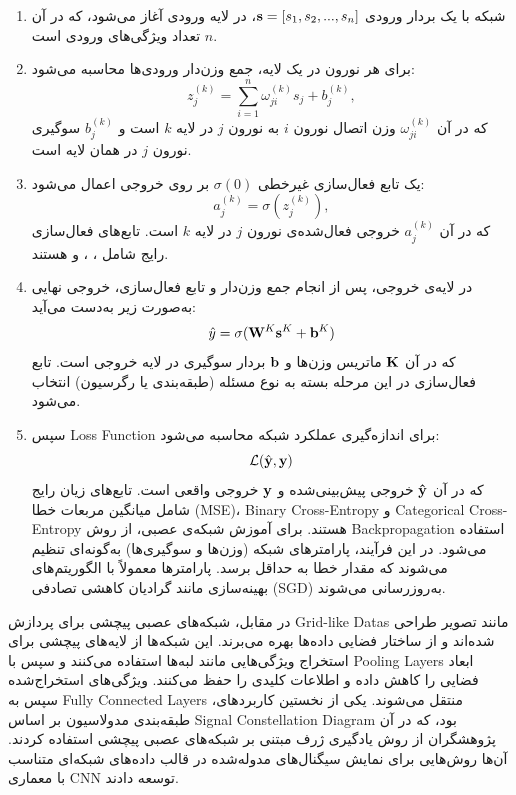 \begin{enumerate}
\item 
شبکه با یک بردار ورودی
$\bold{s} = [s_{1}, s_{2}, ..., s_{n}]$،
در لایه ورودی آغاز می‌شود، که در آن 
$n$
تعداد ویژگی‌های ورودی است.
\item
برای هر نورون در یک لایه، جمع وزن‌دار ورودی‌ها محاسبه می‌شود:
\begin{equation}
	z_{j}^{(k)} = \sum_{i=1}^{n} \omega_{ji}^{(k)} s_j + b_{j}^{(k)} ,
\end{equation}
که در آن 
$\omega_{ji}^{(k)}$
وزن اتصال نورون
$i$
به نورون
$j$
در لایه
$k$
است و
$b_{j}^{(k)}$
سوگیری نورون
$j$
در همان لایه است.
\item 
یک تابع فعال‌سازی غیرخطی
$\sigma(0)$
بر روی خروجی اعمال می‌شود:
\begin{equation}
a_{j}^{(k)} = \sigma(z_{j}^{(k)}) ,
\end{equation}
که در آن
$a_{j}^{(k)}$
خروجی فعال‌شده‌ی نورون
$j$
در لایه 
$k$
است. تابع‌های فعال‌سازی رایج شامل
،
،
 و
هستند.
\item 
در لایه‌ی خروجی، پس از انجام جمع وزن‌دار و تابع فعال‌سازی، خروجی نهایی به‌صورت زیر به‌دست می‌آید:
\begin{equation}
	\hat{y} = \sigma(\bold{W}^{K}\bold{s}^{K} + \bold{b}^{K})
\end{equation}
که در آن
$\bold{K}$
ماتریس وزن‌ها و
$\bold{b}$
بردار سوگیری در لایه خروجی است. تابع فعال‌سازی در این مرحله بسته به نوع مسئله (طبقه‌بندی یا رگرسیون) انتخاب می‌شود.
\item
سپس 
\gls{Loss Function}
برای اندازه‌گیری عملکرد شبکه محاسبه می‌شود:
\begin{equation}
	\mathcal{L}(\hat{\bold{y}},\bold{y})
\end{equation}
که در آن
$\bold{\hat{y}}$
خروجی پیش‌بینی‌شده و
$\bold{y}$
خروجی واقعی است.
تابع‌های زیان رایج شامل میانگین مربعات خطا 
(\gls{MSE})،
\gls{Binary Cross-Entropy}
و 
\gls{Categorical Cross-Entropy}
هستند.
برای آموزش شبکه‌ی عصبی، از روش 
\gls{Backpropagation}
استفاده می‌شود. در این فرآیند، پارامترهای شبکه (وزن‌ها و سوگیری‌ها) به‌گونه‌ای تنظیم می‌شوند که مقدار خطا به حداقل برسد. پارامترها معمولاً با الگوریتم‌های بهینه‌سازی مانند گرادیان کاهشی تصادفی 
(\gls{SGD})
به‌روزرسانی می‌شوند.
\end{enumerate}

در مقابل، شبکه‌های عصبی پیچشی برای پردازش 
\glspl{Grid-like Data}
مانند تصویر طراحی شده‌اند و از ساختار فضایی داده‌ها بهره می‌برند. این شبکه‌ها از لایه‌های پیچشی برای استخراج ویژگی‌هایی مانند لبه‌ها استفاده می‌کنند و سپس با 
\glspl{Pooling Layer}
ابعاد فضایی را کاهش داده و اطلاعات کلیدی را حفظ می‌کنند. ویژگی‌های استخراج‌شده سپس به 
\glspl{Fully Connected Layer}
منتقل می‌شوند.
یکی از نخستین کاربردهای، طبقه‌بندی مدولاسیون بر اساس 
\gls{Signal Constellation Diagram}
بود، که در آن پژوهشگران از روش یادگیری ژرف مبتنی بر شبکه‌های عصبی پیچشی استفاده کردند. آن‌ها روش‌هایی برای نمایش سیگنال‌های مدوله‌شده در قالب داده‌های شبکه‌ای متناسب با معماری 
\gls{CNN}
توسعه دادند.

